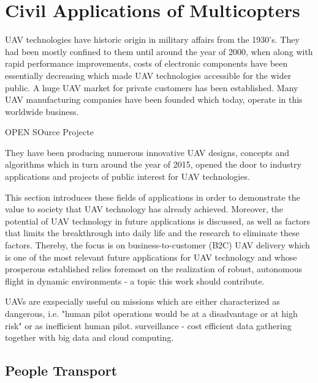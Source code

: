 \section{Civil Applications of Multicopters}

UAV technologies have historic origin
in military
affairs from the 1930's.
They had been mostly confined to them
until around the year of 2000,
when along with
rapid performance improvements,
costs of electronic components
have been essentially decreasing 
which made UAV technologies 
accessible for the wider public.
A huge UAV market for private customers
has been established. Many UAV manufacturing
companies have been founded which today,
operate in this worldwide business.


OPEN SOurce Projecte

They have been producing
numerous innovative
UAV designs, concepts and algorithms
which in turn around
the year of 2015, opened the door
to industry applications
and projects of public interest
for UAV technologies.

This section introduces these
fields of applications in order
to demonstrate the value to society
that UAV technology has already achieved.
Moreover, the potential of UAV technology
in future applications is discussed,
as well as factors that limits the 
breakthrough into daily life
and the research to eliminate these factors.
Thereby, the focus is on 
business-to-customer (B2C) UAV delivery
which is one of the most relevant future applications
for UAV technology and whose prosperous 
established relies foremost 
on the realization of robust,
autonomous flight in dynamic environments -
a topic this work should contribute.


UAVs are exspecially useful on missions
which are either characterized 
as dangerous, 
i.e. "human pilot operations would be at a disadvantage or at high risk"
\cite{Watts2012}
or as inefficient
human pilot.
surveillance - 
cost efficient data gathering together with big data and cloud computing.




\subsection{People Transport}


